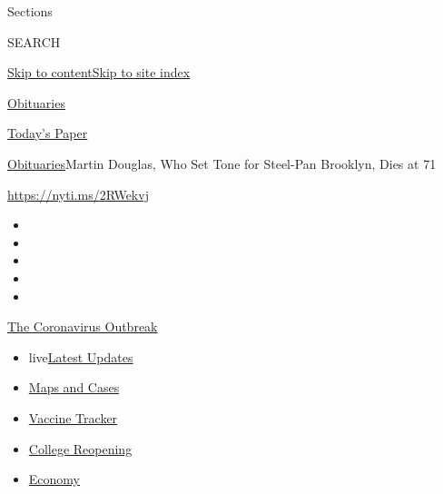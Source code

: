 Sections

SEARCH

\protect\hyperlink{site-content}{Skip to
content}\protect\hyperlink{site-index}{Skip to site index}

\href{https://www.nytimes.com/section/obituaries}{Obituaries}

\href{https://myaccount.nytimes.com/auth/login?response_type=cookie\&client_id=vi}{}

\href{https://www.nytimes.com/section/todayspaper}{Today's Paper}

\href{/section/obituaries}{Obituaries}\textbar{}Martin Douglas, Who Set
Tone for Steel-Pan Brooklyn, Dies at 71

\url{https://nyti.ms/2RWekvj}

\begin{itemize}
\item
\item
\item
\item
\item
\end{itemize}

\href{https://www.nytimes.com/news-event/coronavirus?action=click\&pgtype=Article\&state=default\&region=TOP_BANNER\&context=storylines_menu}{The
Coronavirus Outbreak}

\begin{itemize}
\tightlist
\item
  live\href{https://www.nytimes.com/2020/08/03/world/coronavirus-covid-19.html?action=click\&pgtype=Article\&state=default\&region=TOP_BANNER\&context=storylines_menu}{Latest
  Updates}
\item
  \href{https://www.nytimes.com/interactive/2020/us/coronavirus-us-cases.html?action=click\&pgtype=Article\&state=default\&region=TOP_BANNER\&context=storylines_menu}{Maps
  and Cases}
\item
  \href{https://www.nytimes.com/interactive/2020/science/coronavirus-vaccine-tracker.html?action=click\&pgtype=Article\&state=default\&region=TOP_BANNER\&context=storylines_menu}{Vaccine
  Tracker}
\item
  \href{https://www.nytimes.com/2020/08/02/us/covid-college-reopening.html?action=click\&pgtype=Article\&state=default\&region=TOP_BANNER\&context=storylines_menu}{College
  Reopening}
\item
  \href{https://www.nytimes.com/live/2020/08/03/business/stock-market-today-coronavirus?action=click\&pgtype=Article\&state=default\&region=TOP_BANNER\&context=storylines_menu}{Economy}
\end{itemize}

